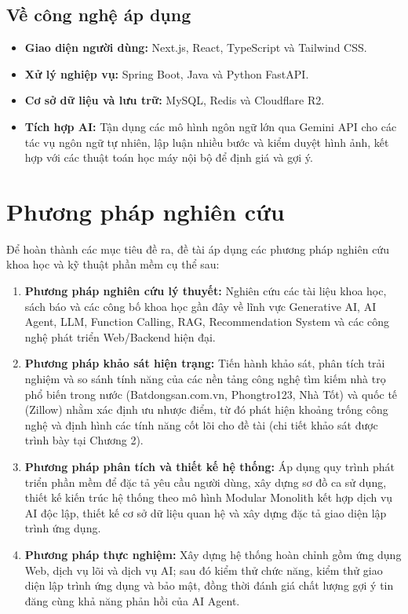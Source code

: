 \FloatBarrier
\subsection{Về công nghệ áp dụng}
\begin{itemize}
    \item \textbf{Giao diện người dùng:} Next.js, React, TypeScript và Tailwind CSS.
    \item \textbf{Xử lý nghiệp vụ:} Spring Boot, Java và Python FastAPI.
    \item \textbf{Cơ sở dữ liệu và lưu trữ:} MySQL, Redis và Cloudflare R2.
    \item \textbf{Tích hợp AI:} Tận dụng các mô hình ngôn ngữ lớn qua Gemini API cho các tác vụ ngôn ngữ tự nhiên, lập luận nhiều bước và kiểm duyệt hình ảnh, kết hợp với các thuật toán học máy nội bộ để định giá và gợi ý.
\end{itemize}

\section{Phương pháp nghiên cứu}

Để hoàn thành các mục tiêu đề ra, đề tài áp dụng các phương pháp nghiên cứu khoa học và kỹ thuật phần mềm cụ thể sau:

\begin{enumerate}
    \item \textbf{Phương pháp nghiên cứu lý thuyết:}
    Nghiên cứu các tài liệu khoa học, sách báo và các công bố khoa học gần đây về lĩnh vực Generative AI, AI Agent, LLM, Function Calling, RAG, Recommendation System và các công nghệ phát triển Web/Backend hiện đại.
    
    \item \textbf{Phương pháp khảo sát hiện trạng:}
    Tiến hành khảo sát, phân tích trải nghiệm và so sánh tính năng của các nền tảng công nghệ tìm kiếm nhà trọ phổ biến trong nước (Batdongsan.com.vn, Phongtro123, Nhà Tốt) và quốc tế (Zillow) nhằm xác định ưu nhược điểm, từ đó phát hiện khoảng trống công nghệ và định hình các tính năng cốt lõi cho đề tài (chi tiết khảo sát được trình bày tại Chương 2).
    
    \item \textbf{Phương pháp phân tích và thiết kế hệ thống:}
    Áp dụng quy trình phát triển phần mềm để đặc tả yêu cầu người dùng, xây dựng sơ đồ ca sử dụng, thiết kế kiến trúc hệ thống theo mô hình Modular Monolith kết hợp dịch vụ AI độc lập, thiết kế cơ sở dữ liệu quan hệ và xây dựng đặc tả giao diện lập trình ứng dụng.
    
    \item \textbf{Phương pháp thực nghiệm:}
    Xây dựng hệ thống hoàn chỉnh gồm ứng dụng Web, dịch vụ lõi và dịch vụ AI; sau đó kiểm thử chức năng, kiểm thử giao diện lập trình ứng dụng và bảo mật, đồng thời đánh giá chất lượng gợi ý tin đăng cùng khả năng phản hồi của AI Agent.
\end{enumerate}






